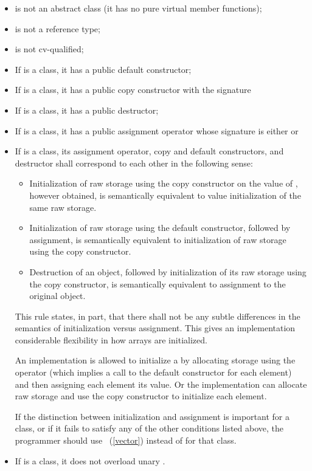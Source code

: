 \begin{itemize}
\item {} is not an abstract class (it has no pure virtual member functions);
\item {} is not a reference type;
\item {} is not cv-qualified;
\item If  is a class, it has a public default constructor;
\item If  is a class, it has a public copy constructor with the signature 
\item If  is a class, it has a public destructor;
\item If  is a class, it has a public assignment operator whose signature is either
or
\item If  is a class, its assignment operator, copy and default constructors,
and destructor shall correspond to each other in the following sense:
 \begin{itemize}
 \item Initialization of raw storage using the copy constructor
   on the value of , however obtained,
   is semantically equivalent to value initialization of the same raw storage.
 \item Initialization of raw storage using the default constructor,
   followed by assignment,
   is semantically equivalent to initialization of raw storage using the copy constructor.
 \item Destruction of an object,
   followed by initialization of its raw storage using the copy constructor,
    is semantically equivalent to assignment to the original object.
 \end{itemize}

\begin{note}
This rule states, in part, that there shall not be any subtle differences in the semantics
of initialization versus assignment.
This gives an implementation
considerable flexibility in how arrays are initialized.

\begin{example}
An implementation is allowed to initialize a
by allocating storage using the
operator (which
implies a call to the default constructor for each element) and then
assigning each element its value.
Or the implementation can allocate raw
storage and use the copy constructor to initialize each element.
\end{example}

If the distinction between initialization and assignment is important
for a class, or if it fails to satisfy any of
the other conditions listed above, the programmer should use
~(\ref{vector}) instead of
for that class.
\end{note}
\item If  is a class, it does not overload unary
.
\end{itemize}


